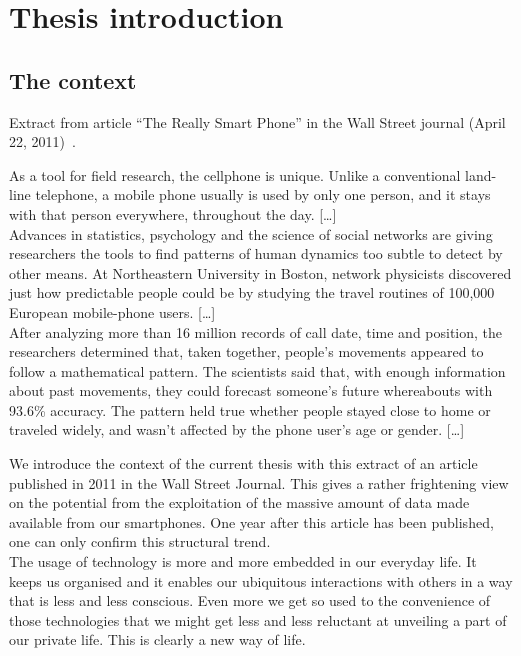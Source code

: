 \chapter{Thesis introduction}

\section{The context}

Extract from article ``The Really Smart Phone'' in the Wall Street journal (April 22, 2011)~\cite{really-smart-phone}.

\begin{quotationalt}
  [\dots]
  As a tool for field research, the cellphone is unique. Unlike a
  conventional land-line telephone, a mobile phone usually is used by
  only one person, and it stays with that person everywhere,
  throughout the day.
  [\dots]\\

  Advances in statistics, psychology and the
  science of social networks are giving researchers the tools to find
  patterns of human dynamics too subtle to detect by other means. At
  Northeastern University in Boston, network physicists discovered
  just how predictable people could be by studying the travel routines
  of 100,000 European mobile-phone users.
  [\dots]\\

  After analyzing more than
  16 million records of call date, time and position, the researchers
  determined that, taken together, people's movements appeared to
  follow a mathematical pattern. The scientists said that, with enough
  information about past movements, they could forecast someone's
  future whereabouts with 93.6\% accuracy.
  The pattern held true whether people stayed close to home or
  traveled widely, and wasn't affected by the phone user's age or
  gender.
  [\dots]\\
\end{quotationalt}

We introduce the context of the current thesis with this extract of an article published in 2011 in the Wall Street Journal.
This gives a rather frightening view on the potential from the exploitation of the massive amount of data made available from our smartphones.
One year after this article has been published, one can only confirm this structural trend.\\

The usage of technology is more and more embedded in our everyday life.
It keeps us organised and it enables our ubiquitous interactions with others in a way that is less and less conscious.
Even more we get so used to the convenience of those technologies that we might get less and less reluctant at unveiling a part of our private life.
This is clearly a new way of life.\\

